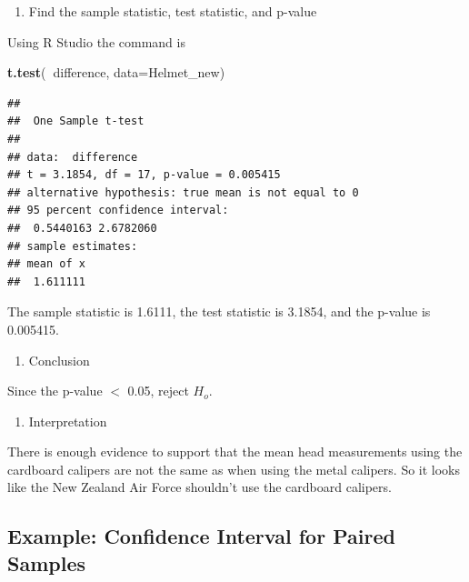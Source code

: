 \documentclass[
]{book}
\newenvironment{Shaded}{\begin{snugshade}}{\end{snugshade}}
\newcommand{\DataTypeTok}[1]{\textcolor[rgb]{0.13,0.29,0.53}{#1}}
\newcommand{\KeywordTok}[1]{\textcolor[rgb]{0.13,0.29,0.53}{\textbf{#1}}}
\newcommand{\NormalTok}[1]{#1}
\newcommand{\OperatorTok}[1]{\textcolor[rgb]{0.81,0.36,0.00}{\textbf{#1}}}
\providecommand{\tightlist}{%
  \setlength{\itemsep}{0pt}\setlength{\parskip}{0pt}}
\begin{document}
\begin{enumerate}
\def\labelenumi{\arabic{enumi}.}
\setcounter{enumi}{3}
\tightlist
\item
  Find the sample statistic, test statistic, and p-value
\end{enumerate}

Using R Studio the command is

\begin{Shaded}
\begin{Highlighting}[]
\KeywordTok{t.test}\NormalTok{(}\OperatorTok{~}\NormalTok{difference, }\DataTypeTok{data=}\NormalTok{Helmet_new)}
\end{Highlighting}
\end{Shaded}

\begin{verbatim}
## 
## 	One Sample t-test
## 
## data:  difference
## t = 3.1854, df = 17, p-value = 0.005415
## alternative hypothesis: true mean is not equal to 0
## 95 percent confidence interval:
##  0.5440163 2.6782060
## sample estimates:
## mean of x 
##  1.611111
\end{verbatim}

The sample statistic is 1.6111, the test statistic is 3.1854, and the p-value is 0.005415.

\begin{enumerate}
\def\labelenumi{\arabic{enumi}.}
\setcounter{enumi}{4}
\tightlist
\item
  Conclusion
\end{enumerate}

Since the p-value \(<\) 0.05, reject \(H_o\).

\begin{enumerate}
\def\labelenumi{\arabic{enumi}.}
\setcounter{enumi}{5}
\tightlist
\item
  Interpretation
\end{enumerate}

There is enough evidence to support that the mean head measurements using the cardboard calipers are not the same as when using the metal calipers. So it looks like the New Zealand Air Force shouldn't use the cardboard calipers.

\hypertarget{example-confidence-interval-for-paired-samples}{%
\subsection{Example: Confidence Interval for Paired Samples}\label{example-confidence-interval-for-paired-samples}}
\end{document}
